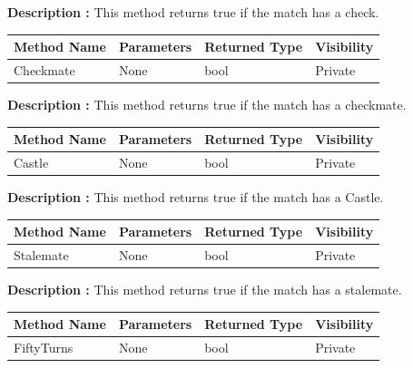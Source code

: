 \documentclass[12pt]{article}
\begin{document}
    \textbf{Description :} This method returns true if the match has a check.

    \begin{table}[H]
        \begin{tabular}{|l|l|l|l|}
            \hline
            \rowcolor[HTML]{EFEFEF}
            \cellcolor[HTML]{EFEFEF}\textbf{Method Name} & \textbf{Parameters} & \textbf{Returned Type} & \textbf{Visibility} \\ \hline
            Checkmate                                    & None                & bool                   & Private             \\ \hline
        \end{tabular}
    \end{table}

    \textbf{Description :} This method returns true if the match has a checkmate.

    \begin{table}[H]
        \begin{tabular}{|l|l|l|l|}
            \hline
            \rowcolor[HTML]{EFEFEF}
            \cellcolor[HTML]{EFEFEF}\textbf{Method Name} & \textbf{Parameters} & \textbf{Returned Type} & \textbf{Visibility} \\ \hline
            Castle                                       & None                & bool                   & Private             \\ \hline
        \end{tabular}
    \end{table}

    \textbf{Description :} This method returns true if the match has a Castle.

    \begin{table}[H]
        \begin{tabular}{|l|l|l|l|}
            \hline
            \rowcolor[HTML]{EFEFEF}
            \cellcolor[HTML]{EFEFEF}\textbf{Method Name} & \textbf{Parameters} & \textbf{Returned Type} & \textbf{Visibility} \\ \hline
            Stalemate                                    & None                & bool                   & Private             \\ \hline
        \end{tabular}
    \end{table}

    \textbf{Description :} This method returns true if the match has a stalemate.

    \begin{table}[H]
        \begin{tabular}{|l|l|l|l|}
            \hline
            \rowcolor[HTML]{EFEFEF}
            \cellcolor[HTML]{EFEFEF}\textbf{Method Name} & \textbf{Parameters} & \textbf{Returned Type} & \textbf{Visibility} \\ \hline
            FiftyTurns                                   & None                & bool                   & Private             \\ \hline
        \end{tabular}
    \end{table}
\end{document}
